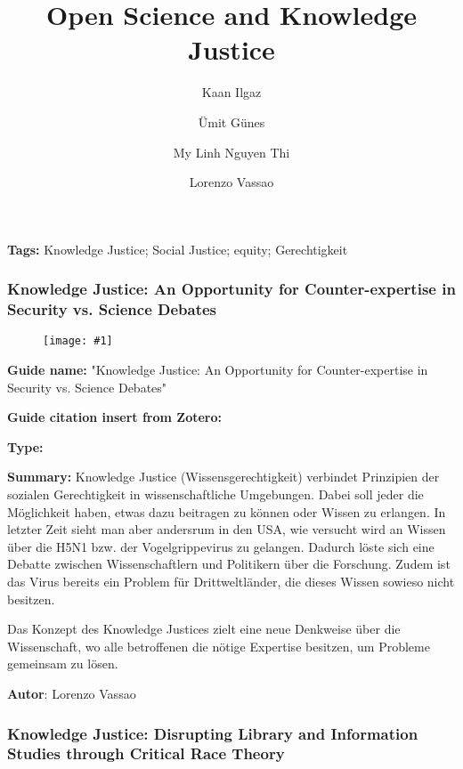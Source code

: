 \documentclass{article}
\newlength{\imgwidth}
\newcommand\scaledgraphics[2]{%
                
\settowidth{\imgwidth}{\texttt{[image: \#1]}}%
                
\setlength{\imgwidth}{\minof{\imgwidth}{#2\textwidth}}%
                
\texttt{[image: \#1]}%
                
}
\begin{document}
\title{Open Science and Knowledge Justice}

\maketitle

\author{Kaan Ilgaz}
\author{Ümit Günes}
\author{My Linh Nguyen Thi}
\author{Lorenzo Vassao}
\affil{}





\textbf{Tags:} Knowledge Justice; Social Justice; equity; Gerechtigkeit


\subsubsection{Knowledge Justice: An Opportunity for Counter-expertise in Security vs. Science Debates}\label{H870315}


\begin{figure}
\scaledgraphics{086e7cc2-fafd-4cc2-8c8f-018ac3a9884d.png}{1}
\label{F24704971}
\end{figure}





\textbf{Guide name:} "Knowledge Justice: An Opportunity for Counter-expertise in Security vs. Science Debates"


\textbf{Guide citation insert from Zotero:} \autocite{r_egert_knowledge_2017}


\textbf{Type:} 


\textbf{Summary: }Knowledge Justice (Wissensgerechtigkeit) verbindet Prinzipien der sozialen Gerechtigkeit in wissenschaftliche Umgebungen. Dabei soll jeder die Möglichkeit haben, etwas dazu beitragen zu können oder Wissen zu erlangen. In letzter Zeit sieht man aber andersrum in den USA, wie versucht wird an Wissen über die H5N1 bzw. der Vogelgrippevirus zu gelangen. Dadurch löste sich eine Debatte zwischen Wissenschaftlern und Politikern über die Forschung. Zudem ist das Virus bereits ein Problem für Drittweltländer, die dieses Wissen sowieso nicht besitzen.


Das Konzept des Knowledge Justices zielt eine neue Denkweise über die Wissenschaft, wo alle betroffenen die nötige Expertise besitzen, um Probleme gemeinsam zu lösen.


\textbf{Autor}: Lorenzo Vassao


\subsubsection{Knowledge Justice: Disrupting Library and Information Studies through Critical Race Theory}\label{H8244312}
\end{document}
